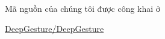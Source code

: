 

Mã nguồn của chúng tôi được công khai ở

\href{https://github.com/DeepGesture/DeepGesture}{DeepGesture/DeepGesture}